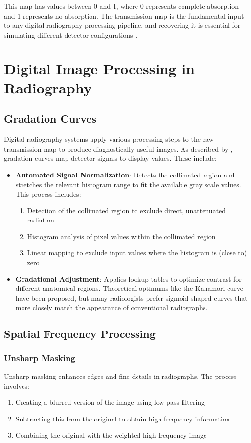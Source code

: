 \documentclass[nomenclature, english, bibtex]{kththesis}
\numberwithin{listing}{chapter}
\begin{document}
This map has values between 0 and 1, where 0 represents complete absorption and 1 represents no absorption. The transmission map is the fundamental input to any digital radiography processing pipeline, and recovering it is essential for simulating different detector configurations \cite{seibert2006flat}.

\section{Digital Image Processing in Radiography}
\subsection{Gradation Curves}
Digital radiography systems apply various processing steps to the raw transmission map to produce diagnostically useful images. As described by \cite{prokop2003principles}, gradation curves map detector signals to display values. These include:

\begin{itemize}
    \item \textbf{Automated Signal Normalization}: Detects the collimated region and stretches the relevant histogram range to fit the available gray scale values. This process includes:
    \begin{enumerate}
        \item Detection of the collimated region to exclude direct, unattenuated radiation
        \item Histogram analysis of pixel values within the collimated region
        \item Linear mapping to exclude input values where the histogram is (close to) zero
    \end{enumerate}

    \item \textbf{Gradational Adjustment}: Applies lookup tables to optimize contrast for different anatomical regions. Theoretical optimums like the Kanamori curve \cite{kanamori1966determination} have been proposed, but many radiologists prefer sigmoid-shaped curves that more closely match the appearance of conventional radiographs.
\end{itemize}

\subsection{Spatial Frequency Processing}
\subsubsection{Unsharp Masking}
Unsharp masking enhances edges and fine details in radiographs. The process involves:
\begin{enumerate}
    \item Creating a blurred version of the image using low-pass filtering
    \item Subtracting this from the original to obtain high-frequency information
    \item Combining the original with the weighted high-frequency image
\end{enumerate}
\end{document}
